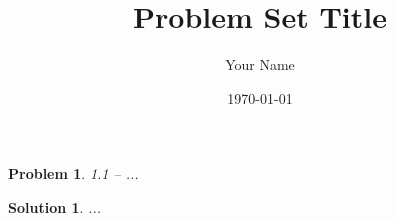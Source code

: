 \documentclass[11pt]{article}
\title{Problem Set Title}
\author{Your Name}
\date{\today}
\newtheorem*{problem}{Problem}
\newtheorem*{solution}{Solution}
\begin{document}
\maketitle

\begin{problem}
1.1 -- ...
\end{problem}

\begin{solution}
...
\end{solution}
\end{document}
